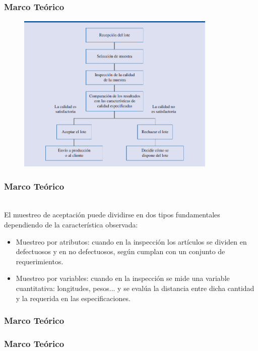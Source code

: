 \documentclass[11pt]{beamer}
\begin{document}
\begin{frame}
\frametitle{Marco Teórico}
\begin{figure}[!h]
        \includegraphics[width=9.5cm]{IMAGENES/MA.png}
        \label{figura1}
\end{figure}
\end{frame}

\begin{frame}
\frametitle{Marco Teórico}
~\\El muestreo de aceptación puede dividirse en dos tipos fundamentales dependiendo de la característica observada:
\begin{itemize}
\item Muestreo por atributos: cuando en la inspección los artículos se dividen en defectuosos y en no defectuosos, según cumplan con un conjunto de requerimientos.
\item Muestreo por variables: cuando en la inspección se mide una variable cuantitativa: longitudes, pesos... y se evalúa la distancia entre dicha cantidad y la requerida en las especificaciones.
\end{itemize}
\end{frame}

\begin{frame}
\frametitle{Marco Teórico}

\end{frame}

\begin{frame}
\frametitle{Marco Teórico}

\end{frame}
\end{document}
